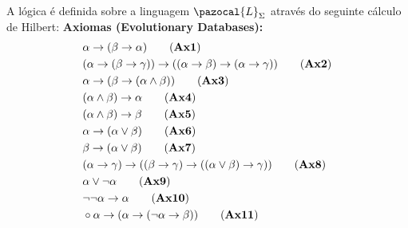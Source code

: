 \begin{definicao}[\lfium{}]
    \label{def:lfi1}
    A lógica \lfium{} é definida sobre a linguagem $\pazocal{L}_{\Sigma}$ através do seguinte cálculo de Hilbert:
    \noindent\textbf{Axiomas (Evolutionary Databases):}
    \begin{align*}
         & \alpha \rightarrow (\beta \rightarrow \alpha)\tag{\textbf{Ax1}}                                                                                     \\
         & (\alpha \rightarrow (\beta \rightarrow \gamma)) \rightarrow ((\alpha \rightarrow \beta) \rightarrow (\alpha \rightarrow \gamma ))\tag{\textbf{Ax2}} \\
         & \alpha \rightarrow (\beta \rightarrow (\alpha \land \beta))\tag{\textbf{Ax3}}                                                                       \\
         & (\alpha \land \beta) \rightarrow \alpha\tag{\textbf{Ax4}}                                                                                           \\
         & (\alpha \land \beta) \rightarrow \beta\tag{\textbf{Ax5}}                                                                                            \\
         & \alpha \rightarrow (\alpha \lor \beta)\tag{\textbf{Ax6}}                                                                                            \\
         & \beta \rightarrow (\alpha \lor \beta)\tag{\textbf{Ax7}}                                                                                             \\
         & (\alpha \rightarrow \gamma) \rightarrow ((\beta \rightarrow \gamma) \rightarrow ((\alpha \lor \beta) \rightarrow \gamma))\tag{\textbf{Ax8}}         \\
         & \alpha \lor \neg \alpha\tag{\textbf{Ax9}}                                                                                                           \\
         & \neg \neg \alpha \rightarrow \alpha\tag{\textbf{Ax10}}                                                                                              \\
         & \circ \alpha \rightarrow (\alpha \rightarrow (\neg \alpha \rightarrow \beta))\tag{\textbf{Ax11}}                                                    \\

\end{align*}
\end{definicao}
